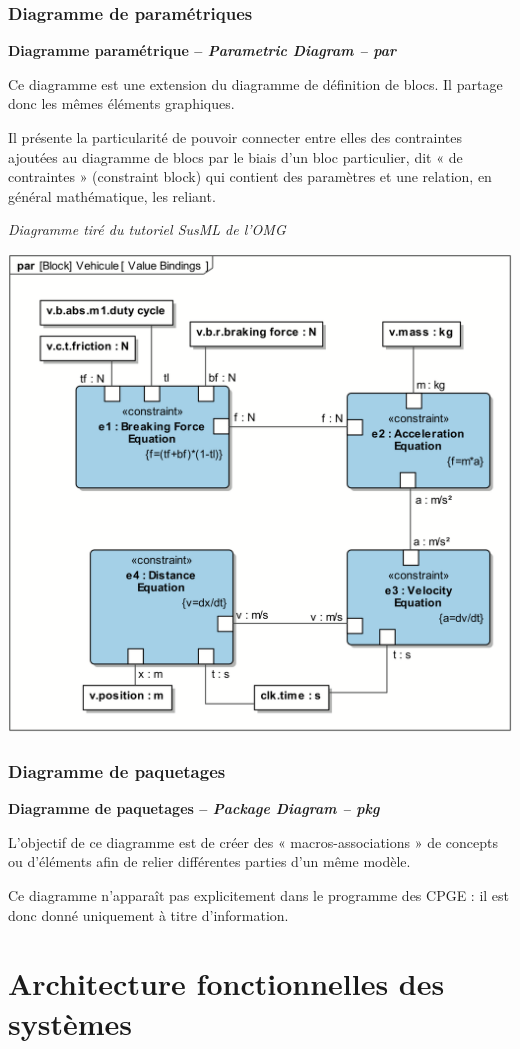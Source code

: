 \documentclass[11pt,oneside]{article}
\begin{document}
\subsubsection{Diagramme de paramétriques}
\begin{defi}
\textbf{Diagramme paramétrique -- \textit{Parametric Diagram -- par}}

Ce diagramme est une extension du diagramme de définition de blocs. Il partage donc les mêmes éléments graphiques.

Il présente la particularité de pouvoir connecter entre elles des contraintes ajoutées au
diagramme de blocs par le biais d’un bloc particulier, dit « de contraintes » (constraint block)
qui contient des paramètres et une relation, en général mathématique, les reliant.

\end{defi}

\begin{center}
\textit{Diagramme tiré du tutoriel SusML de l'OMG}

\includegraphics[width=.5\textwidth]{png/PNG/SysML_Drone_Par}
\end{center}
\subsubsection{Diagramme de paquetages}
\begin{defi}
\textbf{Diagramme de paquetages -- \textit{Package Diagram -- pkg}}

L’objectif de ce diagramme est de créer des « macros-associations » de concepts ou d’éléments
afin de relier différentes parties d’un même modèle.

Ce diagramme n’apparaît pas explicitement dans le programme des CPGE : il est donc
donné uniquement à titre d’information.
\end{defi}

\section{Architecture fonctionnelles des systèmes}
\end{document}
